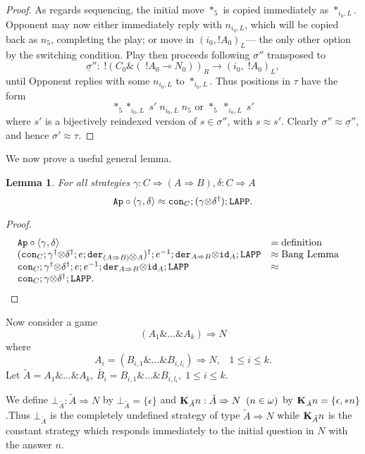 \documentclass[11pt]{article}
\newtheorem{lemma}[theorem]{Lemma}
\newcommand{\with}{\mbox{$\&$}}
\newcommand{\tensor}{\mbox{$\otimes$}}
\newcommand{\linimpl}{\mbox{$\multimap$}}
\newcommand{\lang}{\langle}
\newcommand{\rang}{\rangle}
\begin{document}
\begin{proof}
As regards sequencing, the initial move $*_5$ is copied
immediately as $*_{i_0,L}$. Opponent may now either immediately
reply with $n_{i_0,L}$, which will be copied back as $n_5$,
completing the play; or move in $(i_0,!A_0)_L$--- the only other
option by the switching condition. Play then proceeds following
$\sigma''$ transposed to $$\underline{\sigma}'': \;!(C_0 \with (\;
!A_0\linimpl N_0))_R \rightarrow (i_0,\; !A_0)_L,$$ until Opponent
replies with some $n_{i_0,L}$ to $*_{i_0,L}$. Thus positions in
$\tau$ have the form $$ *_5 *_{i_0,L}\; s'\; n_{i_0,L}\; n_5
\mbox{  or  } *_5 \; *_{i_0,L} \; s'$$ where $s'$ is a bijectively
reindexed version of $s\in\sigma''$, with $s\approx s'$. Clearly
$\sigma''\approx  \underline{\sigma}''$, and hence
$\sigma'\approx\tau$.

\end{proof}

We now prove a useful general lemma.
\begin{lemma}\label{lem6}
For all strategies
$\gamma:C\Rightarrow (A\Rightarrow B), \delta: C\Rightarrow A$
$${\tt Ap}\circ\lang\gamma,\delta\rang \approx {\tt con}_C;(\gamma\tensor\delta^{\dag});{\tt LAPP }.$$
\end{lemma}
\begin{proof}
\[
\begin{array}{llc}
{\tt Ap}\circ\lang\gamma,\delta\rang &= {\mbox{definition}}& \\
({\tt con}_C;\gamma^{\dag}\tensor\delta^{\dag};e;{\tt
der}_{(A\Rightarrow
 B)\tensor A})^{\dag};e^{-1};{\tt der}_{A\Rightarrow B} \tensor {\tt id}_A;{\tt LAPP }
&\approx {\mbox{Bang Lemma}}& \\ {\tt
con}_C;\gamma^{\dag}\tensor\delta^{\dag};e;e^{-1}; {\tt
der}_{A\Rightarrow B}\tensor {\tt id}_A;{\tt LAPP } & \approx&\\
{\tt con}_C;\gamma\tensor\delta^{\dag};{\tt LAPP }. & &
\end{array}
\]
\end{proof}

Now consider a game
$$(A_1\with\dots\with A_k)\Rightarrow N$$
where $$A_i=(B_{i,1}\with\dots\with B_{i,l_i})\Rightarrow N ,\;\;\;
1\leq i\leq k.$$
Let $\tilde{A} = A_1\with\dots\with A_k$, $\tilde{B_i} = B_{i,1}\with
\dots\with B_{i,l_i}, \; 1\leq i\leq k$.

We define
$\bot_{\tilde{A}}:\tilde{A}\Rightarrow N$ by
$\bot_{\tilde{A}}=\{\epsilon\}$
and ${\bf K}_{\tilde{A}}n:\tilde{A} \Rightarrow N \;\; (n\in\omega)$
by ${\bf K}_{\tilde{A}}n=\{\epsilon,*n\}$.Thus $\bot_{\tilde{A}}$ is
the completely undefined strategy of type
$\tilde{A}\Rightarrow N$ while ${\bf K}_{\tilde{A}}n$ is the constant
strategy which responds immediately to the initial question in $N$
with the answer $n$.
\end{document}

